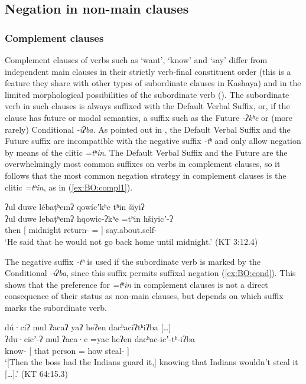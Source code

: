 \documentclass[output=paper,modfonts,nonflat,colorlinks,citecolor=brown]{langscibook}
\begin{document}
\subsection{Negation in non-main clauses}
\label{sec:BO:nonmain}

\subsubsection{Complement clauses}
\label{sec:BO:SubClauses}
Complement clauses of verbs such as `want', `know' and `say' differ from independent main clauses in their strictly verb-final constituent order (this is a feature they share with other types of subordinate clauses in Kashaya) and in the limited morphological possibilities of the subordinate verb (\citealt{Olsson2010}). The subordinate verb in such clauses is always suffixed with the Default Verbal Suffix, or, if the clause has future or modal semantics, a suffix such as the Future \textit{-ʔkʰe} or (more rarely) Conditional \textit{-iʔba}. As pointed out in , the Default Verbal Suffix and the Future suffix are incompatible with the negative suffix \textit{-tʰ} and only allow negation by means of the clitic \textit{=tʰin}. The Default Verbal Suffix and the Future are the overwhelmingly most common suffixes on verbs in complement clauses, so it follows that the most common negation strategy in complement clauses is the clitic \textit{=tʰin}, as in (\ref{ex:BO:compl1}).

\ea 
\label{ex:BO:compl1}
\glll ʔul {} {duwe lébaṭʰemʔ} qowícʼkʰe tʰin {} šiyiʔ\\
    ʔul {} {duwe lebaṭʰemʔ} hqowic-ʔkʰe =tʰin {} hšiyicʼ-ʔ\\
    then {[} midnight return- = {]} say.about.self-\\
\glt `He said that he would not go back home until midnight.' ({KT 3:12.4})\\
\z

The negative suffix \textit{-tʰ} is used if the subordinate verb is marked by the Conditional \textit{-iʔba}, since this suffix permits suffixal negation (\ref{ex:BO:cond}). This shows that the preference for \textit{=tʰin} in complement clauses is not a direct consequence of their status as non-main clauses, but depends on which suffix marks the subordinate verb.

\ea 
\label{ex:BO:cond}
\glll [\ldots] dú·ciʔ {} mul ʔacaʔ yaʔ heʔen dacʰacíʔtʰiʔba {} [\ldots]\\
    {} ʔdu·cicʼ-ʔ {} mul ʔaca·c =yac heʔen dacʰac-icʼ-tʰ-iʔba {} {}\\
    {} know- {[} that person = how steal- {]} {}\\
    \glt `[Then the boss had the Indians guard it,] knowing that Indians wouldn’t steal it [\ldots].' ({KT 64:15.3})
\z
\end{document}
